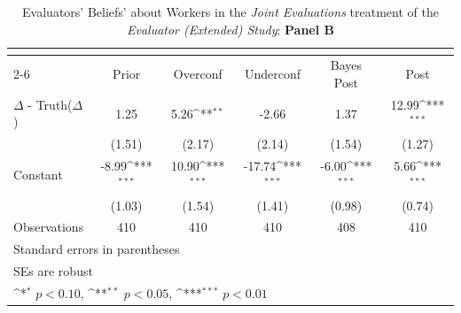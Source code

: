 \begin{table}[htbp]\centering
\def\sym#1{\ifmmode^{#1}\else\(^{#1}\)\fi}
\caption{Evaluators' Beliefs' about Workers in the \textit{Joint Evaluations} treatment of the \textit{Evaluator (Extended) Study}: \textbf{Panel B}}
\begin{tabular}{l*{5}{c}}
\hline\hline
                &\multicolumn{5}{c}{}                                                                          \\\cmidrule(lr){2-6}
                &\multicolumn{1}{c}{Prior}&\multicolumn{1}{c}{Overconf}&\multicolumn{1}{c}{Underconf}&\multicolumn{1}{c}{Bayes Post}&\multicolumn{1}{c}{Post}\\
\hline
$\Delta$ - Truth($\Delta$)&     1.25         &     5.26\sym{**} &    -2.66         &     1.37         &    12.99\sym{***}\\
                &   (1.51)         &   (2.17)         &   (2.14)         &   (1.54)         &   (1.27)         \\
Constant        &    -8.99\sym{***}&    10.90\sym{***}&   -17.74\sym{***}&    -6.00\sym{***}&     5.66\sym{***}\\
                &   (1.03)         &   (1.54)         &   (1.41)         &   (0.98)         &   (0.74)         \\
\hline
Observations    &      410         &      410         &      410         &      408         &      410         \\
\hline\hline
\multicolumn{6}{l}{\footnotesize Standard errors in parentheses}\\
\multicolumn{6}{l}{\footnotesize SEs are robust}\\
\multicolumn{6}{l}{\footnotesize \sym{*} \(p<0.10\), \sym{**} \(p<0.05\), \sym{***} \(p<0.01\)}\\
\end{tabular}
\end{table}
